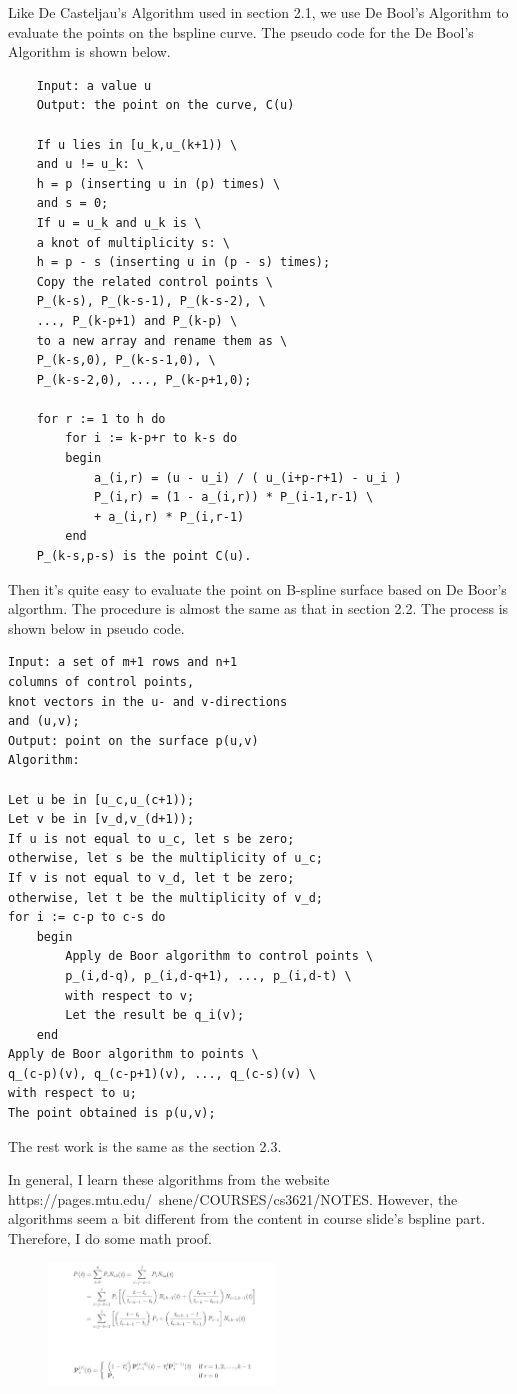 \documentclass[acmtog]{acmart}
\begin{document}
Like De Casteljau's Algorithm used in section 2.1, we use De Bool's Algorithm to evaluate the points on the bspline curve. The pseudo code for the De Bool's Algorithm is shown below.
\begin{lstlisting}
	Input: a value u
	Output: the point on the curve, C(u)
	
	If u lies in [u_k,u_(k+1)) \
	and u != u_k: \
	h = p (inserting u in (p) times) \
	and s = 0;
	If u = u_k and u_k is \
	a knot of multiplicity s: \
	h = p - s (inserting u in (p - s) times);
	Copy the related control points \
	P_(k-s), P_(k-s-1), P_(k-s-2), \
	..., P_(k-p+1) and P_(k-p) \
	to a new array and rename them as \
	P_(k-s,0), P_(k-s-1,0), \
	P_(k-s-2,0), ..., P_(k-p+1,0);
	
	for r := 1 to h do
		for i := k-p+r to k-s do
		begin
			a_(i,r) = (u - u_i) / ( u_(i+p-r+1) - u_i )
			P_(i,r) = (1 - a_(i,r)) * P_(i-1,r-1) \
			+ a_(i,r) * P_(i,r-1)
		end
	P_(k-s,p-s) is the point C(u).
\end{lstlisting}
\quad Then it's quite easy to evaluate the point on B-spline surface based on De Boor's algorthm. 
The procedure is almost the same as that in section 2.2. 
The process is shown below in pseudo code. 
\begin{lstlisting}
Input: a set of m+1 rows and n+1 
columns of control points, 
knot vectors in the u- and v-directions 
and (u,v);
Output: point on the surface p(u,v)
Algorithm:

Let u be in [u_c,u_(c+1));
Let v be in [v_d,v_(d+1));
If u is not equal to u_c, let s be zero; 
otherwise, let s be the multiplicity of u_c;
If v is not equal to v_d, let t be zero; 
otherwise, let t be the multiplicity of v_d;
for i := c-p to c-s do
	begin
		Apply de Boor algorithm to control points \
		p_(i,d-q), p_(i,d-q+1), ..., p_(i,d-t) \
		with respect to v;
		Let the result be q_i(v);
	end
Apply de Boor algorithm to points \
q_(c-p)(v), q_(c-p+1)(v), ..., q_(c-s)(v) \
with respect to u;
The point obtained is p(u,v);
\end{lstlisting}

The rest work is the same as the section 2.3. 

In general, I learn these algorithms from the website \\
 https://pages.mtu.edu/~shene/COURSES/cs3621/NOTES. 
However, the algorithms seem a bit different from the content in course slide's bspline part. Therefore, I do some math proof.
\begin{figure}[h]
	\centering
	{\includegraphics[width=6cm]{math.JPG}}	
\end{figure}
\end{document}
